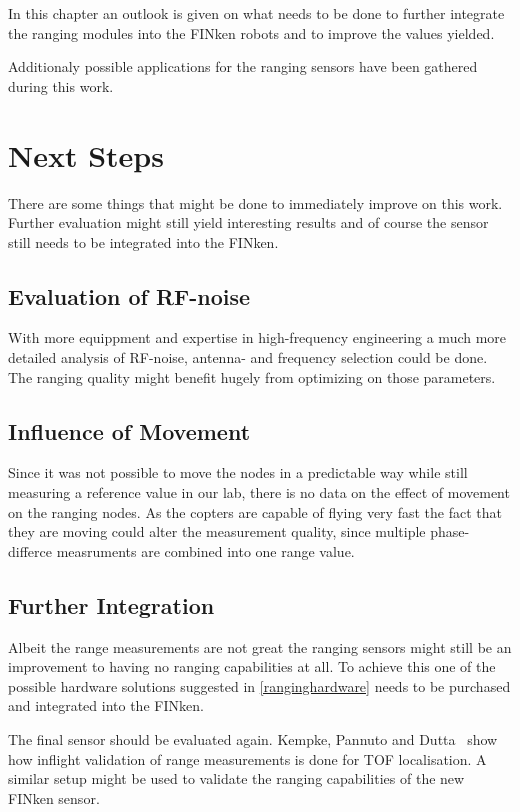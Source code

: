 In this chapter an outlook is given on what needs to be done to further integrate the ranging modules into the FINken robots and to improve the values yielded.

Additionaly possible applications for the ranging sensors have been gathered during this work.

\section{Next Steps}

There are some things that might be done to immediately improve on this work.
Further evaluation might still yield interesting results and of course the sensor still needs to be integrated into the FINken.

\subsection{Evaluation of RF-noise}
With more equippment and expertise in high-frequency engineering a much more detailed analysis of RF-noise, antenna- and frequency selection could be done.
The ranging quality might benefit hugely from optimizing on those parameters.

\subsection{Influence of Movement}
Since it was not possible to move the nodes in a predictable way while still measuring a reference value in our lab, there is no data on the effect of movement on the ranging nodes.
As the copters are capable of flying very fast the fact that they are moving could alter the measurement quality, since multiple phase-differce measruments are combined into one range value.

\subsection{Further Integration}

Albeit the range measurements are not great the ranging sensors might still be an improvement to having no ranging capabilities at all.
To achieve this one of the possible hardware solutions suggested in \autoref{ranginghardware} needs to be purchased and integrated into the FINken.

The final sensor should be evaluated again.
Kempke, Pannuto and Dutta~\cite{uwb_localisation_copter} show how inflight validation of range measurements is done for TOF localisation.
A similar setup might be used to validate the ranging capabilities of the new FINken sensor.

